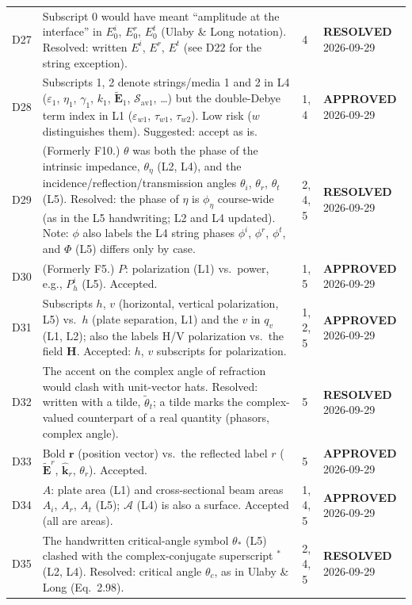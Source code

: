 \documentclass[11pt, oneside]{article}
\newcommand{\approved}{\textbf{APPROVED}}
\newcommand{\resolved}{\textbf{RESOLVED}}
\begin{document}
\begin{longtable}{l >{\raggedright\arraybackslash}p{} l l}
D27 & Subscript 0 would have meant ``amplitude at the interface'' in $E_0^i$, $E_0^r$, $E_0^t$ (Ulaby \& Long notation). Resolved: written $E^i$, $E^r$, $E^t$ (see D22 for the string exception). & 4 & \resolved{} 2026-09-29 \\
D28 & Subscripts 1, 2 denote strings/media 1 and 2 in L4 ($\varepsilon_1$, $\eta_1$, $\gamma_1$, $k_1$, $\tilde{\mathbf{E}}_1$, $\boldsymbol{\mathcal{S}}_{\mathrm{av}1}$, \ldots) but the double-Debye term index in L1 ($\varepsilon_{w1}$, $\tau_{w1}$, $\tau_{w2}$). Low risk ($w$ distinguishes them). Suggested: accept as is. & 1, 4 & \approved{} 2026-09-29 \\
D29 & (Formerly F10.) $\theta$ was both the phase of the intrinsic impedance, $\theta_\eta$ (L2, L4), and the incidence/reflection/transmission angles $\theta_i$, $\theta_r$, $\theta_t$ (L5). Resolved: the phase of $\eta$ is $\phi_\eta$ course-wide (as in the L5 handwriting; L2 and L4 updated). Note: $\phi$ also labels the L4 string phases $\phi^i$, $\phi^r$, $\phi^t$, and $\Phi$ (L5) differs only by case. & 2, 4, 5 & \resolved{} 2026-09-29 \\
D30 & (Formerly F5.) $P$: polarization (L1) vs.\ power, e.g., $P_h^i$ (L5). Accepted. & 1, 5 & \approved{} 2026-09-29 \\
D31 & Subscripts $h$, $v$ (horizontal, vertical polarization, L5) vs.\ $h$ (plate separation, L1) and the $v$ in $q_v$ (L1, L2); also the labels H/V polarization vs.\ the field $\mathbf{H}$. Accepted: $h$, $v$ subscripts for polarization. & 1, 2, 5 & \approved{} 2026-09-29 \\
D32 & The accent on the complex angle of refraction would clash with unit-vector hats. Resolved: written with a tilde, $\tilde{\theta}_t$; a tilde marks the complex-valued counterpart of a real quantity (phasors, complex angle). & 5 & \resolved{} 2026-09-29 \\
D33 & Bold $\mathbf{r}$ (position vector) vs.\ the reflected label $r$ ($\tilde{\mathbf{E}}^r$, $\hat{\mathbf{k}}_r$, $\theta_r$). Accepted. & 5 & \approved{} 2026-09-29 \\
D34 & $A$: plate area (L1) and cross-sectional beam areas $A_i$, $A_r$, $A_t$ (L5); $\mathcal{A}$ (L4) is also a surface. Accepted (all are areas). & 1, 4, 5 & \approved{} 2026-09-29 \\
D35 & The handwritten critical-angle symbol $\theta_*$ (L5) clashed with the complex-conjugate superscript $^*$ (L2, L4). Resolved: critical angle $\theta_c$, as in Ulaby \& Long (Eq.~2.98). & 2, 4, 5 & \resolved{} 2026-09-29 \\

\end{longtable}
\end{document}
